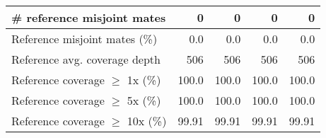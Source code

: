 \documentclass[12pt,a4paper]{article}
\begin{document}
\begin{table}[ht]
\begin{center}
\begin{tabular}{|l*{4}{|r}|}
\# reference misjoint mates & 0 & 0 & 0 & 0 \\ \hline
Reference misjoint mates (\%) & 0.0 & 0.0 & 0.0 & 0.0 \\ \hline
Reference avg. coverage depth & 506 & 506 & 506 & 506 \\ \hline
Reference coverage $\geq$ 1x (\%) & 100.0 & 100.0 & 100.0 & 100.0 \\ \hline
Reference coverage $\geq$ 5x (\%) & 100.0 & 100.0 & 100.0 & 100.0 \\ \hline
Reference coverage $\geq$ 10x (\%) & 99.91 & 99.91 & 99.91 & 99.91 \\ \hline
\end{tabular}
\end{center}
\end{table}
\end{document}
